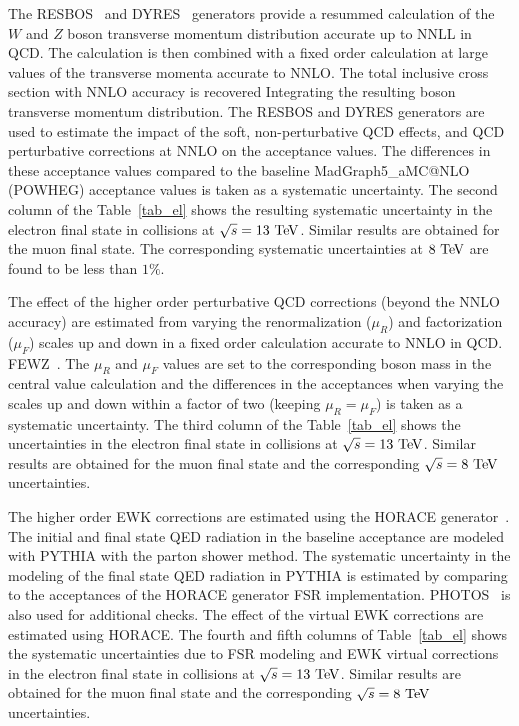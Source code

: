 The RESBOS~\cite{resbos} and DYRES~\cite{dyres,dyres2} generators provide a resummed calculation of the $W$ and $Z$ boson transverse momentum distribution accurate up to NNLL in QCD. The calculation is then combined with a fixed order calculation at large values of the transverse momenta accurate to NNLO. The total inclusive cross section with NNLO accuracy is recovered Integrating the resulting boson transverse momentum distribution. The RESBOS and DYRES generators are used to estimate the impact of the soft, non-perturbative QCD effects, and QCD perturbative corrections at NNLO on the acceptance values. The differences in these acceptance values compared to the baseline MadGraph5\_aMC@NLO (POWHEG) acceptance values is taken as a systematic uncertainty.  The second column of the Table~\ref{tab_el} shows the resulting systematic uncertainty in the electron final state in collisions at $\sqrt{s}=13~\mathrm{Te\kern -0.1em V}$. Similar results are obtained for the muon final state. The corresponding systematic uncertainties at $8~\mathrm{Te\kern -0.1em V}$ are found to be less than $1\%$. 

The effect of the higher order perturbative QCD corrections (beyond the NNLO accuracy) are estimated from varying the renormalization ($\mu_{R}$) and factorization ($\mu_F$) scales up and down in a fixed order calculation accurate to NNLO in QCD. FEWZ~\cite{Gavin:2010az,Gavin:2012sy,Li:2012wna}. The $\mu_R$ and $\mu_F$ values are set to the corresponding boson mass in the central value calculation and the differences in the acceptances when varying the scales up and down within a factor of two (keeping $\mu_R=\mu_F$) is taken as a systematic uncertainty. The third column of the Table~\ref{tab_el} shows the uncertainties in the electron final state in collisions at $\sqrt{s}=13~\mathrm{Te\kern -0.1em V}$. Similar results are obtained for the muon final state and the corresponding $\sqrt{s}=8~\mathrm{Te\kern -0.1em V}$ uncertainties.    

The higher order EWK corrections are estimated using the HORACE generator~\cite{Calame:608890,CarloniCalame:2005vc,CarloniCalame:2006zq,CarloniCalame:2007cd}. The initial and final state QED radiation in the baseline acceptance are modeled with PYTHIA with the parton shower method. The systematic uncertainty in the modeling of the final state QED radiation in PYTHIA is estimated by comparing to the acceptances of the HORACE generator FSR implementation. PHOTOS~\cite{photos} is also used for additional checks. The effect of the virtual EWK corrections are estimated using HORACE. The fourth and fifth columns of Table~\ref{tab_el} shows the systematic uncertainties due to FSR modeling and EWK virtual corrections in the electron final state in collisions at $\sqrt{s}=13~\mathrm{Te\kern -0.1em V}$. Similar results are obtained for the muon final state and the corresponding $\sqrt{s}=8~\mathrm{Te\kern -0.1em V}$ uncertainties. 

